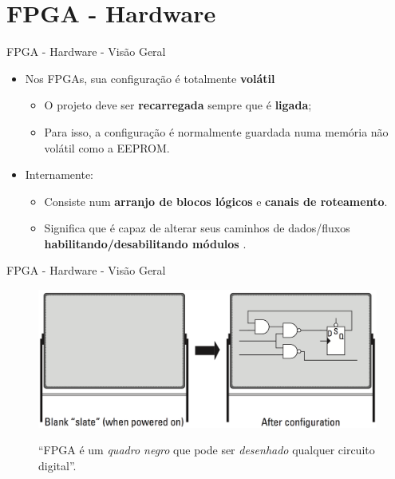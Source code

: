 \documentclass[aspectratio=169]{beamer}
\begin{document}
\section{FPGA - Hardware}
	\begin{frame}{FPGA - Hardware - Visão Geral}
		\begin{itemize}
			\setlength\itemsep{1.5em}
			\item Nos FPGAs, sua configuração é totalmente \textbf{volátil}
			\begin{itemize}
				\setlength\itemsep{1em}
				\item O projeto deve ser \textbf{recarregada} sempre que é \textbf{ligada};
				\item Para isso, a configuração é normalmente guardada numa memória não volátil como a EEPROM.
			\end{itemize}
			
			\item Internamente:
			\begin{itemize}
				\setlength\itemsep{1em}
				\item Consiste num \textbf{arranjo de blocos lógicos} e \textbf{canais de roteamento}.
			
				\item Significa que é capaz de alterar seus caminhos de dados/fluxos \textbf{habilitando/desabilitando módulos} \cite{moreira2008}.
			\end{itemize}
		\end{itemize}
	\end{frame}
	
	
	\begin{frame}{FPGA - Hardware - Visão Geral}
		\begin{figure}[h]
			\centering
			\caption{``FPGA é um \textit{quadro negro} que pode ser \textit{desenhado} qualquer circuito digital''.}
			\includegraphics[height=0.7\textheight]{img/fpga/quadro.png}
			\label{fig:quadro}
		\end{figure}
	\end{frame}
	
\end{document}
